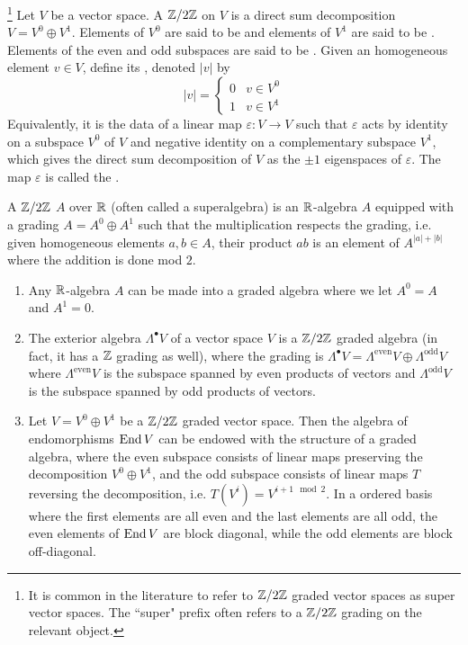 \begin{defn}\footnote{It is common in the literature to refer to $\mathbb{Z}/2\mathbb{Z}$
graded vector spaces as super vector spaces. The ``super" prefix often refers
to a $\mathbb{Z}/2\mathbb{Z}$ grading on the relevant object.}
Let $V$ be a vector space. A $\mathbb{Z} /2\mathbb{Z}$  on $V$ is a direct sum
decomposition $V = V^0 \oplus V^1$. Elements of $V^0$ are said to be 
and elements of $V^1$ are said to be . Elements of the even and odd
subspaces are said to be . Given an homogeneous element
$v \in V$, define its , denoted $|v|$ by
\[
|v| = \begin{cases}
0 & v \in V^0 \\
1 & v \in V^1
\end{cases}
\]
Equivalently, it is the data of a linear map
$\varepsilon : V \to V$ such that $\varepsilon$ acts by identity on a subspace $V^0$
of $V$ and negative identity on a complementary subspace $V^1$, which gives the
direct sum decomposition of $V$ as the $\pm 1$ eigenspaces of $\varepsilon$.
The map $\varepsilon$ is called the .

\end{defn}
%
\begin{defn}
A $\mathbb{Z}/2\mathbb{Z}$  $A$ over $\mathbb{R}$ (often called a superalgebra) is
an $\mathbb{R}$-algebra $A$ equipped with a grading $A = A^0 \oplus A^1$ such that
the multiplication respects the grading, i.e. given homogeneous elements
$a,b \in A$, their product $ab$ is an element of $A^{|a| + |b|}$ where the
addition is done mod $2$.
\end{defn}
%
\begin{exmp}\enumbreak
\begin{enumerate}
\item Any $\mathbb{R}$-algebra $A$ can be made into a graded algebra where we let
    $A^0 = A$ and $A^1 = 0$.
\item The exterior algebra $\Lambda^\bullet V$ of a vector space $V$ is
    a $\mathbb{Z}/2\mathbb{Z}$ graded algebra (in fact, it has a $\mathbb{Z}$ grading as well), where the
    grading is
    $\Lambda^\bullet V = \Lambda^{\text{even}} V \oplus \Lambda^{\text{odd}} V$
    where $\Lambda^{\text{even}} V$ is the subspace spanned by even products of
    vectors and $\Lambda^{\text{odd}} V$ is the subspace spanned by odd products of vectors.
\item Let $V = V^0 \oplus V^1$ be a $\mathbb{Z}/2\mathbb{Z}$ graded vector space. Then the
    algebra of endomorphisms $\operatorname{End} V$ can be endowed with the structure of a
    graded algebra, where the even subspace consists of linear maps preserving
    the decomposition $V^0 \oplus V^1$, and the odd subspace consists of
    linear maps $T$ reversing the decomposition, i.e. $T(V^i) = V^{i + 1 \mod 2}$.
    In a ordered basis where the first elements are all even and the last
    elements are all odd, the even elements of $\operatorname{End} V$ are block diagonal,
    while the odd elements are block off-diagonal.
    \qedhere\end{enumerate}
\end{exmp}
